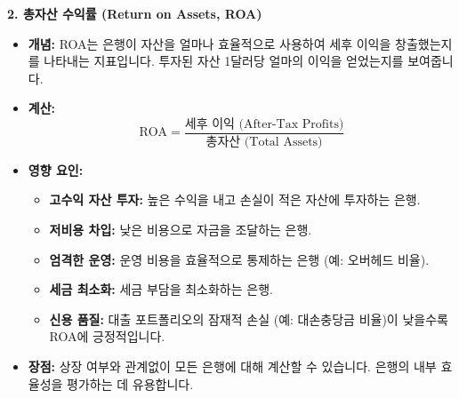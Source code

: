 \documentclass[11pt,a4paper]{book}
\theoremstyle{definition}
\begin{document}
\textbf{2. 총자산 수익률 (Return on Assets, ROA)}
\begin{itemize}
    \item \textbf{개념:} ROA는 은행이 자산을 얼마나 효율적으로 사용하여 세후 이익을 창출했는지를 나타내는 지표입니다. 투자된 자산 1달러당 얼마의 이익을 얻었는지를 보여줍니다.
    \item \textbf{계산:}
    \begin{equation*}
        \text{ROA} = \frac{\text{세후 이익 (After-Tax Profits)}}{\text{총자산 (Total Assets)}}
    \end{equation*}
    \item \textbf{영향 요인:}
        \begin{itemize}
            \item \textbf{고수익 자산 투자:} 높은 수익을 내고 손실이 적은 자산에 투자하는 은행.
            \item \textbf{저비용 차입:} 낮은 비용으로 자금을 조달하는 은행.
            \item \textbf{엄격한 운영:} 운영 비용을 효율적으로 통제하는 은행 (예: 오버헤드 비율).
            \item \textbf{세금 최소화:} 세금 부담을 최소화하는 은행.
            \item \textbf{신용 품질:} 대출 포트폴리오의 잠재적 손실 (예: 대손충당금 비율)이 낮을수록 ROA에 긍정적입니다.
        \end{itemize}
    \item \textbf{장점:} 상장 여부와 관계없이 모든 은행에 대해 계산할 수 있습니다. 은행의 내부 효율성을 평가하는 데 유용합니다.
\end{itemize}
\end{document}
